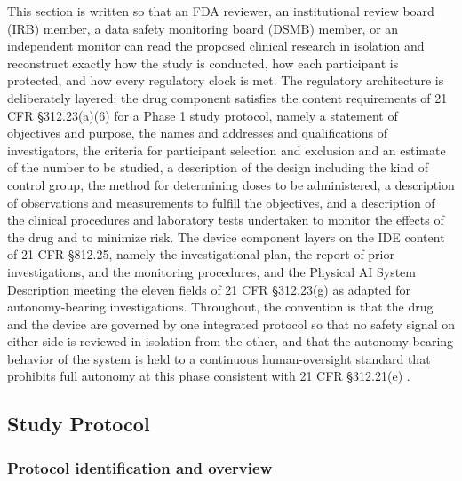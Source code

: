 This section is written so that an FDA reviewer, an institutional review board (IRB)
member, a data safety monitoring board (DSMB) member, or an independent monitor can
read the proposed clinical research in isolation and reconstruct exactly how the
study is conducted, how each participant is protected, and how every regulatory
clock is met. The regulatory architecture is deliberately layered: the drug
component satisfies the content requirements of 21 CFR \S 312.23(a)(6) for a Phase 1
study protocol, namely a statement of objectives and purpose, the names and
addresses and qualifications of investigators, the criteria for participant
selection and exclusion and an estimate of the number to be studied, a description
of the design including the kind of control group, the method for determining doses
to be administered, a description of observations and measurements to fulfill the
objectives, and a description of the clinical procedures and laboratory tests
undertaken to monitor the effects of the drug and to minimize risk. The device
component layers on the IDE content of 21 CFR \S 812.25, namely the investigational
plan, the report of prior investigations, and the monitoring procedures, and the
Physical AI System Description meeting the eleven fields of 21 CFR \S 312.23(g) as
adapted for autonomy-bearing investigations. Throughout, the convention is that the
drug and the device are governed by one integrated protocol so that no safety signal
on either side is reviewed in isolation from the other, and that the autonomy-bearing
behavior of the system is held to a continuous human-oversight standard that prohibits
full autonomy at this phase consistent with 21 CFR \S 312.21(e)
\cite{phase1guidance,congress9510}.

\subsection{Study Protocol}

\subsubsection*{Protocol identification and overview}

